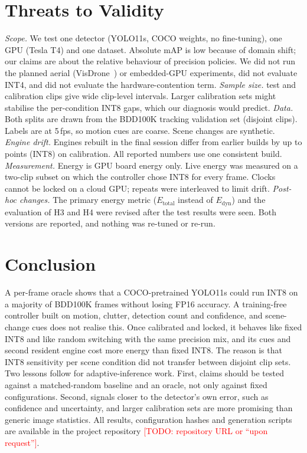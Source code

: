 \documentclass{svproc}
\newcommand{\TODO}[1]{\textcolor{red}{[TODO: #1]}}
\begin{document}
\section{Threats to Validity}\label{sec:threats}
\emph{Scope.} We test one detector (YOLO11s, COCO weights, no fine-tuning), one GPU (Tesla T4) and one dataset. Absolute mAP is low
because of domain shift; our claims are about the relative behaviour of precision policies. We did not run the planned aerial (VisDrone~\cite{visdrone})
or embedded-GPU experiments, did not evaluate INT4, and did not evaluate the hardware-contention term.
\emph{Sample size.} \TestClips{} test and \CalibClips{} calibration clips give wide clip-level intervals. Larger calibration sets might
stabilise the per-condition INT8 gaps, which our diagnosis would predict.
\emph{Data.} Both splits are drawn from the BDD100K tracking validation set (disjoint clips). Labels are at 5\,fps, so motion
cues are coarse. Scene changes are synthetic.
\emph{Engine drift.} Engines rebuilt in the final session differ from earlier builds by up to \DriftINTeight{} points (INT8)
on calibration. All reported numbers use one consistent build.
\emph{Measurement.} Energy is GPU board energy only. Live energy was measured on a two-clip subset on which the controller chose INT8
for every frame. Clocks cannot be locked on a cloud GPU; repeats were interleaved to limit drift.
\emph{Post-hoc changes.} The primary energy metric ($E_\text{total}$ instead of $E_\text{dyn}$) and the evaluation of H3 and H4 were
revised after the test results were seen. Both versions are reported, and nothing was re-tuned or re-run.

\section{Conclusion}
A per-frame oracle shows that a COCO-pretrained YOLO11s could run INT8 on a majority of BDD100K frames without losing FP16 accuracy.
A training-free controller built on motion, clutter, detection count and confidence, and scene-change cues does not realise this.
Once calibrated and locked, it behaves like fixed INT8 and like random switching with the same precision mix, and its cues and second resident
engine cost more energy than fixed INT8. The reason is that INT8 sensitivity per scene condition did not transfer between disjoint clip sets.
Two lessons follow for adaptive-inference work. First, claims should be tested against a matched-random baseline and an oracle, not only against fixed
configurations. Second, signals closer to the detector's own error, such as confidence and uncertainty, and larger calibration sets are more promising than
generic image statistics. All results, configuration hashes and generation scripts are available in the project repository \TODO{repository URL or ``upon request''}.
\end{document}
